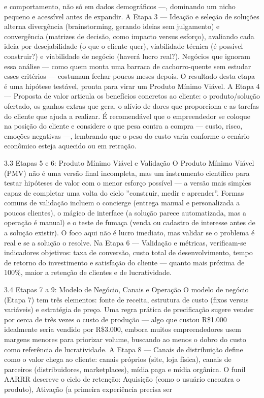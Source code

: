 e comportamento, não só em dados demográficos —, dominando um nicho pequeno e acessível antes de expandir. A Etapa 3 — Ideação e seleção de soluções alterna divergência (brainstorming, gerando ideias sem julgamento) e convergência (matrizes de decisão, como impacto versus esforço), avaliando cada ideia por desejabilidade (o que o cliente quer), viabilidade técnica (é possível construir?) e viabilidade de negócio (haverá lucro real?). Negócios que ignoram essa análise — como quem monta uma barraca de cachorro-quente sem estudar esses critérios — costumam fechar poucos meses depois. O resultado desta etapa é uma hipótese testável, pronta para virar um Produto Mínimo Viável. A Etapa 4 — Proposta de valor articula os benefícios concretos ao cliente: o produto/solução ofertado, os ganhos extras que gera, o alívio de dores que proporciona e as tarefas do cliente que ajuda a realizar. É recomendável que o empreendedor se coloque na posição do cliente e considere o que pesa contra a compra — custo, risco, emoções negativas —, lembrando que o peso do custo varia conforme o cenário econômico esteja aquecido ou em retração.

3.3 Etapas 5 e 6: Produto Mínimo Viável e Validação O Produto Mínimo Viável (PMV) não é uma versão final incompleta, mas um instrumento científico para testar hipóteses de valor com o menor esforço possível — a versão mais simples capaz de completar uma volta do ciclo ”construir, medir e aprender”. Formas comuns de validação incluem o concierge (entrega manual e personalizada a poucos clientes), o mágico de interface (a solução parece automatizada, mas a operação é manual) e o teste de fumaça (venda ou cadastro de interesse antes de a solução existir). O foco aqui não é lucro imediato, mas validar se o problema é real e se a solução o resolve. Na Etapa 6 — Validação e métricas, verificam-se indicadores objetivos: taxa de conversão, custo total de desenvolvimento, tempo de retorno do investimento e satisfação do cliente — quanto mais próxima de 100\%, maior a retenção de clientes e de lucratividade.

3.4 Etapas 7 a 9: Modelo de Negócio, Canais e Operação O modelo de negócio (Etapa 7) tem três elementos: fonte de receita, estrutura de custo (fixos versus variáveis) e estratégia de preço. Uma regra prática de precificação sugere vender por cerca de três vezes o custo de produção — algo que custou R\$1.000 idealmente seria vendido por R\$3.000, embora muitos empreendedores usem margens menores para priorizar volume, buscando ao menos o dobro do custo como referência de lucratividade. A Etapa 8 — Canais de distribuição define como o valor chega ao cliente: canais próprios (site, loja física), canais de parceiros (distribuidores, marketplaces), mídia paga e mídia orgânica. O funil AARRR descreve o ciclo de retenção: Aquisição (como o usuário encontra o produto), Ativação (a primeira experiência precisa ser

